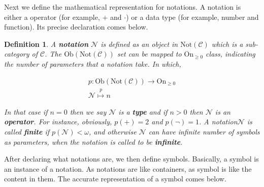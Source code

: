 \documentclass{aims}
\numberwithin{equation}{section}
\newtheorem{definition}{Definition}	%
\numberwithin{theorem}{section}	%
\numberwithin{axiom}{section}	%
\numberwithin{definition}{section}	%
\begin{document}
	Next we define the mathematical representation for notations. A notation is either a operator (for example, \(+\) and \(\cdot\)) or a data type (for example, number and function). Its precise declaration comes below.
	
	\begin{definition}
		A \textbf{ notation} \(\mathcal{N}\) is defined as an object in \(\text{Not}(\mathcal{C})\) which is a sub-category of \(\mathcal{C}\). The \(\text{Ob}(\text{Not}(\mathcal{C}))\) set can be mapped to \(\text{On}_{\geq 0}\) class, indicating the number of parameters that a notation take. In which,
		
		\begin{equation}
			\begin{gathered}
				\mathit{p}:\text{Ob}(\text{Not}(\mathcal{C}))\to \text{On}_{\geq 0}\\
				\mathcal{N}\overset{\mathit{p}}{\mapsto}n
			\end{gathered}
		\end{equation}
		
		In that case if \(n=0\) then we say \(\mathcal{N}\) is a \textbf{ type} and if \(n>0\) then \(\mathcal{N}\) is an \textbf{ operator}. For instance, obviously, \(\mathit{p}(+)=2\) and \(\mathit{p}(\neg )=1\). A notation\(\mathcal{N}\) is called \textbf{ finite} if \(\mathit{p}(\mathcal{N})<\omega\), and otherwise \(\mathcal{N}\) can have infinite number of symbols as parameters, when the notation is called to be \textbf{ infinite}.
	\end{definition}
	
	After declaring what notations are, we then define symbols. Basically, a symbol is an instance of a notation. As notations are like containers, as symbol is like the content in them. The accurate representation of a symbol comes below.
	
\end{document}
